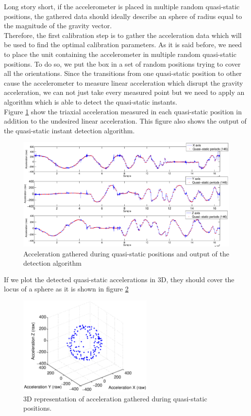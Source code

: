 Long story short, if the accelerometer is placed in multiple random quasi-static positions, the gathered data should ideally describe an sphere of radius equal to the magnitude of the gravity vector. \\
\indent Therefore, the first calibration step is to gather the acceleration data which will be used to find the optimal calibration parameters. As it is said before, we need to place the unit containing the accelerometer in multiple random quasi-static positions. To do so, we put the box in a set of random positions trying to cover all the orientations. Since the transitions from one quasi-static position to other cause the accelerometer to measure linear acceleration which disrupt the gravity acceleration, we can not just take every measured point but we need to apply an algorithm which is able to detect the quasi-static instants. \\
Figure \ref{fig:acc_multiposition_signals} show the triaxial acceleration measured in each quasi-static position in addition to the undesired linear acceleration. This figure also shows the output of the quasi-static instant detection algorithm. 

\begin{figure}[H]
\centering
\includegraphics[width=1\textwidth]{figures/acc_multiposition_signals.eps}
\caption{Acceleration gathered during quasi-static positions and output of the detection algorithm}
\label{fig:acc_multiposition_signals}
\end{figure}

If we plot the detected quasi-static accelerations in 3D, they should cover the locus of a sphere as it is shown in figure \ref{fig:acc_multiposition_3D}

\begin{figure}[H]
\centering
\includegraphics[width=0.6\textwidth]{figures/acc_multiposition_3D.eps}
\caption{3D representation of acceleration gathered during quasi-static positions.}
\label{fig:acc_multiposition_3D}
\end{figure}

